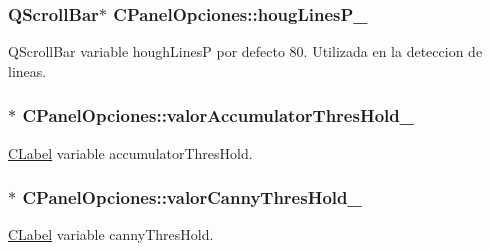 \subsubsection[{\texorpdfstring{houg\+Lines\+P\+\_\+}{hougLinesP_}}]{\setlength{\rightskip}{0pt plus 5cm}Q\+Scroll\+Bar$\ast$ C\+Panel\+Opciones\+::houg\+Lines\+P\+\_\+\hspace{0.3cm}{\ttfamily [private]}}\hypertarget{classCPanelOpciones_a8e5bbb65d75f9dec3623b1796465c583}{}\label{classCPanelOpciones_a8e5bbb65d75f9dec3623b1796465c583}


Q\+Scroll\+Bar variable hough\+LinesP por defecto 80. Utilizada en la deteccion de lineas. 

\subsubsection[{\texorpdfstring{valor\+Accumulator\+Thres\+Hold\+\_\+}{valorAccumulatorThresHold_}}]{$\ast$ C\+Panel\+Opciones\+::valor\+Accumulator\+Thres\+Hold\+\_\+\hspace{0.3cm}{\ttfamily [private]}}\hypertarget{classCPanelOpciones_a206f20e0afadfa1bfda3c59cd2ca16b2}{}\label{classCPanelOpciones_a206f20e0afadfa1bfda3c59cd2ca16b2}


\hyperlink{classCLabel}{C\+Label} variable accumulator\+Thres\+Hold. 

\subsubsection[{\texorpdfstring{valor\+Canny\+Thres\+Hold\+\_\+}{valorCannyThresHold_}}]{$\ast$ C\+Panel\+Opciones\+::valor\+Canny\+Thres\+Hold\+\_\+\hspace{0.3cm}{\ttfamily [private]}}\hypertarget{classCPanelOpciones_a09a2c503f1520a71866669fd84b95ebf}{}\label{classCPanelOpciones_a09a2c503f1520a71866669fd84b95ebf}


\hyperlink{classCLabel}{C\+Label} variable canny\+Thres\+Hold. 

